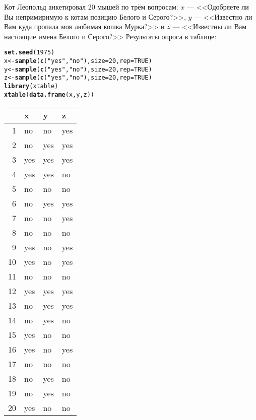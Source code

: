 \documentclass[pdftex,11pt,openany]{book}\usepackage[]{graphicx}\usepackage[]{color}
\makeatletter
\newcommand{\hlnum}[1]{\textcolor[rgb]{0.686,0.059,0.569}{#1}}%
\newcommand{\hlstr}[1]{\textcolor[rgb]{0.192,0.494,0.8}{#1}}%
\newcommand{\hlstd}[1]{\textcolor[rgb]{0.345,0.345,0.345}{#1}}%
\newcommand{\hlkwb}[1]{\textcolor[rgb]{0.69,0.353,0.396}{#1}}%
\newcommand{\hlkwc}[1]{\textcolor[rgb]{0.333,0.667,0.333}{#1}}%
\newcommand{\hlkwd}[1]{\textcolor[rgb]{0.737,0.353,0.396}{\textbf{#1}}}%
\newenvironment{kframe}{%
 \def\at@end@of@kframe{}%
 \ifinner\ifhmode%
  \def\at@end@of@kframe{\end{minipage}}%
  \begin{minipage}{\columnwidth}%
 \fi\fi%
 \def\FrameCommand##1{\hskip\@totalleftmargin \hskip-\fboxsep
 \colorbox{shadecolor}{##1}\hskip-\fboxsep
     \hskip-\linewidth \hskip-\@totalleftmargin \hskip\columnwidth}%
 \MakeFramed {\advance\hsize-\width
   \@totalleftmargin\z@ \linewidth\hsize
   \@setminipage}}%
 {\par\unskip\endMakeFramed%
 \at@end@of@kframe}
\makeatother
\begin{document}
\begin{problem}
Кот Леопольд анкетировал 20 мышей по трём вопросам: $x$ --- <<Одобряете ли Вы непримиримую к котам позицию Белого и Серого?>>, $y$ --- <<Известно ли Вам куда пропала моя любимая кошка Мурка?>> и $z$ --- <<Известны ли Вам настоящие имена Белого и Серого?>> Результаты опроса в таблице:
\begin{kframe}
\begin{alltt}
\hlkwd{set.seed}\hlstd{(}\hlnum{1975}\hlstd{)}
\hlstd{x} \hlkwb{<-} \hlkwd{sample}\hlstd{(}\hlkwd{c}\hlstd{(}\hlstr{"yes"}\hlstd{,}\hlstr{"no"}\hlstd{),}\hlkwc{size}\hlstd{=}\hlnum{20}\hlstd{,}\hlkwc{rep}\hlstd{=}\hlnum{TRUE}\hlstd{)}
\hlstd{y} \hlkwb{<-} \hlkwd{sample}\hlstd{(}\hlkwd{c}\hlstd{(}\hlstr{"yes"}\hlstd{,}\hlstr{"no"}\hlstd{),}\hlkwc{size}\hlstd{=}\hlnum{20}\hlstd{,}\hlkwc{rep}\hlstd{=}\hlnum{TRUE}\hlstd{)}
\hlstd{z} \hlkwb{<-} \hlkwd{sample}\hlstd{(}\hlkwd{c}\hlstd{(}\hlstr{"yes"}\hlstd{,}\hlstr{"no"}\hlstd{),}\hlkwc{size}\hlstd{=}\hlnum{20}\hlstd{,}\hlkwc{rep}\hlstd{=}\hlnum{TRUE}\hlstd{)}
\hlkwd{library}\hlstd{(xtable)}
\hlkwd{xtable}\hlstd{(}\hlkwd{data.frame}\hlstd{(x,y,z))}
\end{alltt}
\end{kframe}%
\begin{table}[ht]
\centering
\begin{tabular}{rlll}
  \hline
 & x & y & z \\ 
  \hline
1 & no & no & yes \\ 
  2 & no & yes & yes \\ 
  3 & yes & yes & yes \\ 
  4 & yes & yes & no \\ 
  5 & no & no & no \\ 
  6 & no & yes & yes \\ 
  7 & no & no & yes \\ 
  8 & no & no & no \\ 
  9 & yes & no & yes \\ 
  10 & yes & no & yes \\ 
  11 & no & no & no \\ 
  12 & yes & yes & yes \\ 
  13 & no & yes & yes \\ 
  14 & no & yes & no \\ 
  15 & yes & no & no \\ 
  16 & yes & no & yes \\ 
  17 & no & no & no \\ 
  18 & no & yes & no \\ 
  19 & no & yes & no \\ 
  20 & yes & no & no \\ 
   \hline
\end{tabular}
\end{table}





\end{problem}
\end{document}
